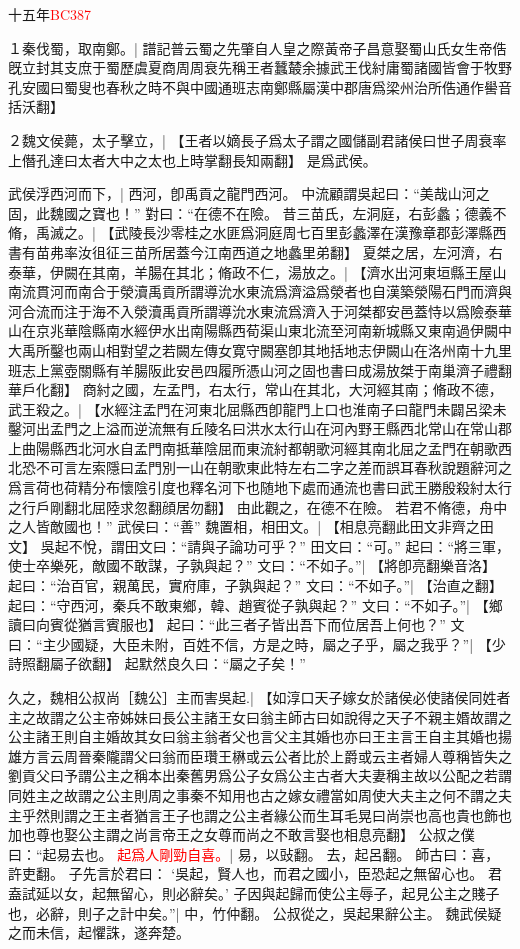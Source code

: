 十五年\textcolor{red}{\small{}BC387}

１秦伐蜀，取南鄭。|{
	譜記普云蜀之先肇自人皇之際黃帝子昌意娶蜀山氏女生帝俈旣立封其支庶于蜀歷虞夏商周周衰先稱王者蠶樷余據武王伐紂庸蜀諸國皆會于牧野孔安國曰蜀叟也春秋之時不與中國通班志南鄭縣屬漢中郡唐爲梁州治所俈通作嚳音括沃翻】
	}


２魏文侯薨，太子擊立，|{
	【王者以嫡長子爲太子謂之國儲副君諸侯曰世子周衰率上僭孔達曰太者大中之太也上時掌翻長知兩翻】}
是爲武侯。

武侯浮西河而下，|{
	西河，卽禹貢之龍門西河。
	}
中流顧謂吳起曰：“美哉山河之固，此魏國之寶也！”
對曰：“在德不在險。
	昔三苗氏，左洞庭，右彭蠡；德義不脩，禹滅之。|{
	【武陵長沙零桂之水匪爲洞庭周七百里彭蠡澤在漢豫章郡彭澤縣西書有苗弗率汝徂征三苗所居蓋今江南西道之地蠡里弟翻】}
	夏桀之居，左河濟，右泰華，伊闕在其南，羊腸在其北；脩政不仁，湯放之。|{
	【濟水出河東垣縣王屋山南流貫河而南合于滎瀆禹貢所謂導沇水東流爲濟溢爲滎者也自漢築滎陽石門而濟與河合流而注于海不入滎瀆禹貢所謂導沇水東流爲濟入于河桀都安邑蓋恃以爲險泰華山在京兆華陰縣南水經伊水出南陽縣西荀渠山東北流至河南新城縣又東南過伊闕中大禹所鑿也兩山相對望之若闕左傳女寛守闕塞卽其地括地志伊闕山在洛州南十九里班志上黨壺關縣有羊腸阪此安邑四履所憑山河之固也書曰成湯放桀于南巢濟子禮翻華戶化翻】}
	商紂之國，左孟門，右太行，常山在其北，大河經其南；脩政不德，武王殺之。|{
	【水經注孟門在河東北屈縣西卽龍門上口也淮南子曰龍門未闢呂梁未鑿河出孟門之上溢而逆流無有丘陵名曰洪水太行山在河內野王縣西北常山在常山郡上曲陽縣西北河水自孟門南抵華陰屈而東流紂都朝歌河經其南北屈之孟門在朝歌西北恐不可言左索隱曰孟門別一山在朝歌東此特左右二字之差而誤耳春秋說題辭河之爲言荷也荷精分布懷陰引度也釋名河下也随地下處而通流也書曰武王勝殷殺紂太行之行戶剛翻北屈陸求忽翻顔居勿翻】
	}
	由此觀之，在德不在險。
	若君不脩德，舟中之人皆敵國也！”
武侯曰：“善”
魏置相，相田文。|{
	【相息亮翻此田文非齊之田文】}
吳起不悅，謂田文曰：“請與子論功可乎？”
田文曰：“可。”
起曰：“將三軍，使士卒樂死，敵國不敢謀，子孰與起？”
文曰：“不如子。”|{
	【將卽亮翻樂音洛】}
起曰：“治百官，親萬民，實府庫，子孰與起？”
文曰：“不如子。”|{
	【治直之翻】
	}
起曰：“守西河，秦兵不敢東鄉，韓、趙賓從子孰與起？”
文曰：“不如子。”|{
	【鄉讀曰向賓從猶言賓服也】}
起曰：“此三者子皆出吾下而位居吾上何也？”
文曰：“主少國疑，大臣未附，百姓不信，方是之時，屬之子乎，屬之我乎？”|{
	【少詩照翻屬子欲翻】}
起默然良久曰：“屬之子矣！”

久之，魏相公叔尚［魏公］主而害吳起.|{
	【如淳口天子嫁女於諸侯必使諸侯同姓者主之故謂之公主帝姊妹曰長公主諸王女曰翁主師古曰如說得之天子不親主㛰故謂之公主諸王則自主婚故其女曰翁主翁者父也言父主其婚也亦曰王主言王自主其婚也揚雄方言云周晉秦隴謂父曰翁而臣瓚王楙或云公者比於上爵或云主者婦人尊稱皆失之劉貢父曰予謂公主之稱本出秦舊男爲公子女爲公主古者大夫妻稱主故以公配之若謂同姓主之故謂之公主則周之事秦不知用也古之嫁女禮當如周使大夫主之何不謂之夫主乎然則謂之王主者猶言王子也謂之公主者緣公而生耳毛晃曰尚崇也高也貴也飾也加也尊也娶公主謂之尚言帝王之女尊而尚之不敢言娶也相息亮翻】
	}
公叔之僕曰：“起易去也。
\textcolor{red}{起爲人剛勁自喜。}|{
	易，以䜴翻。
	去，起呂翻。
	師古曰：喜，許吏翻。
	}
子先言於君曰：
‘吳起，賢人也，而君之國小，臣恐起之無留心也。
君盍試延以女，起無留心，則必辭矣。’
子因與起歸而使公主辱子，起見公主之賤子也，必辭，則子之計中矣。”|{
	中，竹仲翻。}
公叔從之，吳起果辭公主。
魏武侯疑之而未信，起懼誅，遂奔楚。

